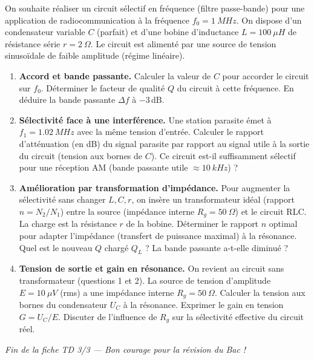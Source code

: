 \documentclass[11pt]{article}
\begin{document}
\begin{exercice}
On souhaite réaliser un circuit sélectif en fréquence (filtre passe-bande) pour une application de radiocommunication à la fréquence $f_0 = \SI{1}{MHz}$. On dispose d'un condensateur variable $C$ (parfait) et d'une bobine d'inductance $L = \SI{100}{\mu H}$ de résistance série $r = \SI{2}{\Omega}$. Le circuit est alimenté par une source de tension sinusoïdale de faible amplitude (régime linéaire).

\begin{enumerate}
    \item \textbf{Accord et bande passante.} Calculer la valeur de $C$ pour accorder le circuit sur $f_0$. Déterminer le facteur de qualité $Q$ du circuit à cette fréquence. En déduire la bande passante $\Delta f$ à $-3\,\text{dB}$.
    \item \textbf{Sélectivité face à une interférence.} Une station parasite émet à $f_1 = \SI{1.02}{MHz}$ avec la même tension d'entrée. Calculer le rapport d'atténuation (en dB) du signal parasite par rapport au signal utile à la sortie du circuit (tension aux bornes de $C$). Ce circuit est-il suffisamment sélectif pour une réception AM (bande passante utile $\approx \SI{10}{kHz}$) ?
    \item \textbf{Amélioration par transformation d'impédance.} Pour augmenter la sélectivité sans changer $L, C, r$, on insère un transformateur idéal (rapport $n = N_2/N_1$) entre la source (impédance interne $R_g = \SI{50}{\Omega}$) et le circuit RLC. La charge est la résistance $r$ de la bobine. Déterminer le rapport $n$ optimal pour adapter l'impédance (transfert de puissance maximal) à la résonance. Quel est le nouveau $Q$ chargé $Q_L$ ? La bande passante a-t-elle diminué ?
    \item \textbf{Tension de sortie et gain en résonance.} On revient au circuit sans transformateur (questions 1 et 2). La source de tension d'amplitude $E = \SI{10}{\mu V}$ (rms) a une impédance interne $R_g = \SI{50}{\Omega}$. Calculer la tension aux bornes du condensateur $U_C$ à la résonance. Exprimer le gain en tension $G = U_C / E$. Discuter de l'influence de $R_g$ sur la sélectivité effective du circuit réel.
\end{enumerate}
\end{exercice}

\vfill
\begin{center}
    \textit{Fin de la fiche TD 3/3 — Bon courage pour la révision du Bac !}
\end{center}
\end{document}
